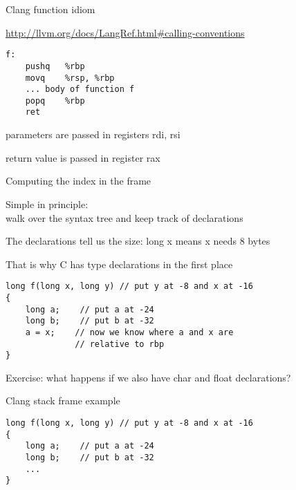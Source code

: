 \documentclass[landscape]{beamer}
\begin{document}
\begin{frame}[fragile]{Clang function idiom}

\url{http://llvm.org/docs/LangRef.html#calling-conventions}

\begin{verbatim}
f:
	pushq	%rbp
	movq	%rsp, %rbp
    ... body of function f
	popq	%rbp
	ret
\end{verbatim}

parameters are passed in registers rdi, rsi

return value is passed in register rax
\end{frame}



\begin{frame}[fragile]{Computing the index in the frame}

Simple in principle: 
\\
walk over the syntax tree and keep track of declarations

The declarations tell us the size: long x means x needs 8 bytes

That is why C has type declarations in the first place

\begin{verbatim}
long f(long x, long y) // put y at -8 and x at -16
{
    long a;    // put a at -24
    long b;    // put b at -32
    a = x;    // now we know where a and x are 
              // relative to rbp
}    
\end{verbatim}

Exercise: what happens if we also have char and float declarations?    
\end{frame}

\begin{frame}[fragile]{Clang stack frame example}
\begin{verbatim}
long f(long x, long y) // put y at -8 and x at -16
{
    long a;    // put a at -24
    long b;    // put b at -32
    ...
}
\end{verbatim}
  
  
\end{frame} 
\end{document}
